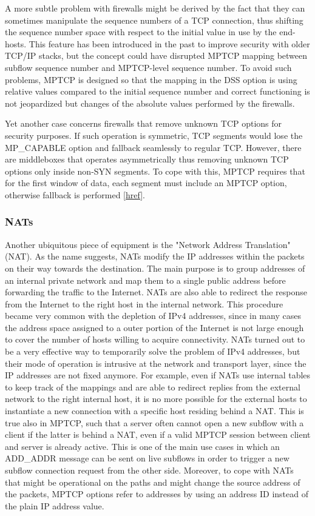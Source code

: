 A more subtle problem with firewalls might be derived by the fact that they can sometimes manipulate the sequence numbers of a TCP connection, thus shifting the sequence number space with respect to the initial value in use by the end-hosts. This feature has been introduced in the past to improve security with older TCP/IP stacks, but the concept could have disrupted MPTCP mapping between subflow sequence number and MPTCP-level sequence number. To avoid such problems, MPTCP is designed so that the mapping in the DSS option is using relative values compared to the initial sequence number and correct functioning is not jeopardized but changes of the absolute values performed by the firewalls.

Yet another case concerns firewalls that remove unknown TCP options for security purposes. If such operation is symmetric, TCP segments would lose the MP\_CAPABLE option and fallback seamlessly to regular TCP. However, there are middleboxes that operates asymmetrically thus removing unknown TCP options only inside non-SYN segments. To cope with this, MPTCP requires that for the first window of data, each segment must include an MPTCP option, otherwise fallback is performed [\href{http://conferences.sigcomm.org/co-next/2013/workshops/HotMiddlebox/program/p37.pdf}{href}].

\subsubsection{NATs}
Another ubiquitous piece of equipment is the "Network Address Translation" (NAT). As the name suggests, NATs modify the IP addresses within the packets on their way towards the destination. The main purpose is to group addresses of an internal private network and map them to a single public address before forwarding the traffic to the Internet. NATs are also able to redirect the response from the Internet to the right host in the internal network.
This procedure became very common with the depletion of IPv4 addresses, since in many cases the address space assigned to a outer portion of the Internet is not large enough to cover the number of hosts willing to acquire connectivity. 
NATs turned out to be a very effective way to temporarily solve the problem of IPv4 addresses, but their mode of operation is intrusive at the network and transport layer, since the IP addresses are not fixed anymore.
For example, even if NATs use internal tables to keep track of the mappings and are able to redirect replies from the external network to the right internal host, it is no more possible for the external hosts to instantiate a new connection with a specific host residing behind a NAT. This is true also in MPTCP, such that a server often cannot open a new subflow with a client if the latter is behind a NAT, even if a valid MPTCP session between client and server is already active. This is one of the main use cases in which an ADD\_ADDR message can be sent on live subflows in order to trigger a new subflow connection request from the other side.
Moreover, to cope with NATs that might be operational on the paths and might change the source address of the packets, MPTCP options refer to addresses by using an address ID instead of the plain IP address value. 


